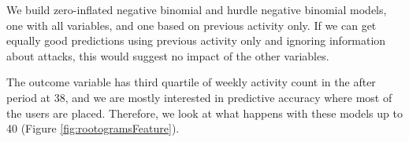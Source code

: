 \documentclass[10pt,]{scrartcl}
\begin{document}
\footnotesize

\normalsize 

\footnotesize

\normalsize

\footnotesize

\normalsize

We build zero-inflated negative binomial and hurdle negative binomial
models, one with all variables, and one based on previous activity only.
If we can get equally good predictions using previous activity only and
ignoring information about attacks, this would suggest no impact of the
other variables.

\footnotesize 

\normalsize

The outcome variable has third quartile of weekly activity count in the
\textsf{after} period at 38, and we are mostly interested in predictive
accuracy where most of the users are placed. Therefore, we look at what
happens with these models up to 40 (Figure \ref{fig:rootogramsFeature}).
\end{document}
